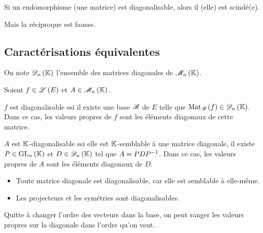 \begin{prop}
Si un endomorphisme (une matrice) est diagonalisable, alors il (elle) est scindé(e).
\end{prop}

Mais la réciproque est fausse.

\subsection{Caractérisations équivalentes}

On note \(\diago{n}\) l'ensemble des matrices diagonales de \(\M{n}\).

\begin{prop}
Soient \(f\in\mathscr{L}\left(E\right)\) et \(A\in\M{n}\).

\(f\) est diagonalisable ssi il existe une base \(\mathscr{B}\) de \(E\) telle que \(\Mat{f}\in\diago{n}\). Dans ce cas, les valeurs propres de \(f\) sont les éléments diagonaux de cette matrice.

\(A\) est \(\mathbb{K}\)-diagonalisable ssi elle est \(\mathbb{K}\)-semblable à une matrice diagonale, \ie il existe \(P\in\GL{n}\) et \(D\in\diago{n}\) tel que \(A=PDP^{-1}\). Dans ce cas, les valeurs propres de \(A\) sont les éléments diagonaux de \(D\).
\end{prop}

\begin{ex}
\begin{itemize}
    \item Toute matrice diagonale est diagonalisable, car elle est semblable à elle-même. \\
    \item Les projecteurs et les symétries sont diagonalisables.
\end{itemize}
\end{ex}

\begin{rem}
Quitte à changer l'ordre des vecteurs dans la base, on peut ranger les valeurs propres sur la diagonale dans l'ordre qu'on veut.
\end{rem}

